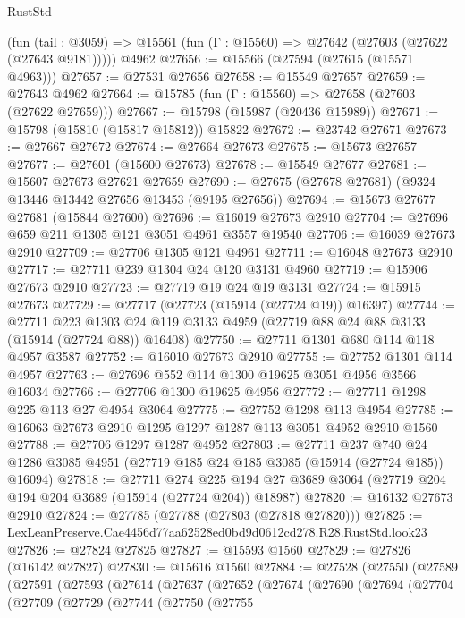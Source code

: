 \begin{lexlean}{RustStd}
\begin{coremodule}
    (fun (tail : @3059) => @15561 (fun (Γ : @15560) => @27642 (@27603 (@27622 (@27643 @9181)))))
    @4962
@27656 := @15566 (@27594 (@27615 (@15571 @4963)))
@27657 := @27531 @27656
@27658 := @15549 @27657
@27659 := @27643 @4962
@27664 := @15785 (fun (Γ : @15560) => @27658 (@27603 (@27622 @27659)))
@27667 := @15798 (@15987 (@20436 @15989))
@27671 := @15798 (@15810 (@15817 @15812)) @15822
@27672 := @23742 @27671
@27673 := @27667 @27672
@27674 := @27664 @27673
@27675 := @15673 @27657
@27677 := @27601 (@15600 @27673)
@27678 := @15549 @27677
@27681 := @15607 @27673 @27621 @27659
@27690 := @27675 (@27678 @27681) (@9324 @13446 @13442 @27656 @13453 (@9195 @27656))
@27694 := @15673 @27677 @27681 (@15844 @27600)
@27696 := @16019 @27673 @2910
@27704 := @27696 @659 @211 @1305 @121 @3051 @4961 @3557 @19540
@27706 := @16039 @27673 @2910
@27709 := @27706 @1305 @121 @4961
@27711 := @16048 @27673 @2910
@27717 := @27711 @239 @1304 @24 @120 @3131 @4960
@27719 := @15906 @27673 @2910
@27723 := @27719 @19 @24 @19 @3131
@27724 := @15915 @27673
@27729 := @27717 (@27723 (@15914 (@27724 @19)) @16397)
@27744 := @27711
    @223
    @1303
    @24
    @119
    @3133
    @4959
    (@27719 @88 @24 @88 @3133 (@15914 (@27724 @88)) @16408)
@27750 := @27711 @1301 @680 @114 @118 @4957 @3587
@27752 := @16010 @27673 @2910
@27755 := @27752 @1301 @114 @4957
@27763 := @27696 @552 @114 @1300 @19625 @3051 @4956 @3566 @16034
@27766 := @27706 @1300 @19625 @4956
@27772 := @27711 @1298 @225 @113 @27 @4954 @3064
@27775 := @27752 @1298 @113 @4954
@27785 := @16063 @27673 @2910 @1295 @1297 @1287 @113 @3051 @4952 @2910 @1560
@27788 := @27706 @1297 @1287 @4952
@27803 := @27711
    @237
    @740
    @24
    @1286
    @3085
    @4951
    (@27719 @185 @24 @185 @3085 (@15914 (@27724 @185)) @16094)
@27818 := @27711
    @274
    @225
    @194
    @27
    @3689
    @3064
    (@27719 @204 @194 @204 @3689 (@15914 (@27724 @204)) @18987)
@27820 := @16132 @27673 @2910
@27824 := @27785 (@27788 (@27803 (@27818 @27820)))
@27825 := LexLeanPreserve.Cae4456d77aa62528ed0bd9d0612cd278.R28.RustStd.look23
@27826 := @27824 @27825
@27827 := @15593 @1560
@27829 := @27826 (@16142 @27827)
@27830 := @15616 @1560
@27884 := @27528
    (@27550
      (@27589
        (@27591
          (@27593
            (@27614
              (@27637
                (@27652
                  (@27674
                    (@27690
                      (@27694
                        (@27704
                          (@27709
                            (@27729
                              (@27744
                                (@27750
                                  (@27755

\end{coremodule}
\end{lexlean}
